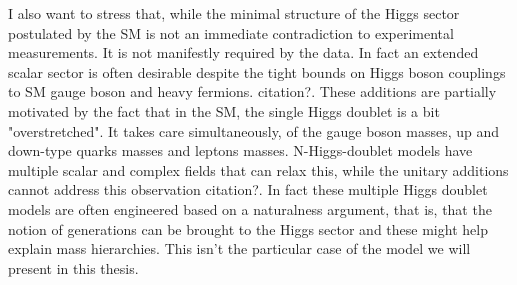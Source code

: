 %

I also want to stress that, while the minimal structure of the Higgs sector postulated by the SM is not an immediate contradiction to experimental measurements. It is not manifestly required by the data. In fact an extended scalar sector is often desirable despite the tight bounds on Higgs boson couplings to SM gauge boson and heavy fermions. {\color{red} citation?}.   
%
These additions are partially motivated by the fact that in the SM, the single Higgs doublet is  a bit "overstretched".  It  takes  care  simultaneously, of the gauge boson masses, up and down-type quarks masses and leptons masses. N-Higgs-doublet models have multiple scalar and complex fields that can relax this, while the unitary additions cannot address this observation {\color{red} citation?}.   
%
In fact these multiple Higgs doublet models are often engineered based on a naturalness argument, that is, that the  notion  of  generations  can  be  brought  to  the  Higgs  sector and these might help explain mass hierarchies. This isn't the particular case of the model we will present in this thesis. 



